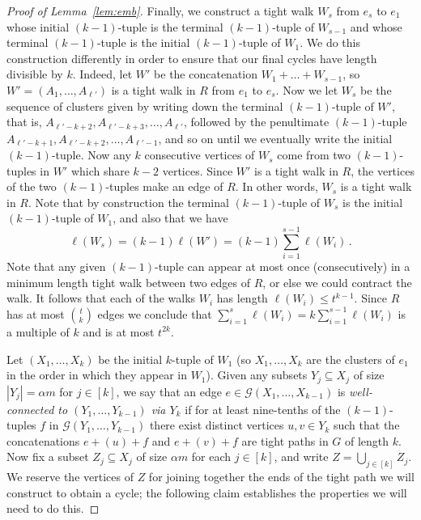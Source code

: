 \documentclass[12pt,a4paper]{amsart}
\newcommand{\cG}{\mathcal{G}}
\begin{document}
\begin{proof}[Proof of Lemma~\ref{lem:emb}]
 Finally, we construct a tight walk $W_s$ from $e_s$ to $e_1$ whose initial $(k-1)$-tuple is the terminal $(k-1)$-tuple of $W_{s-1}$ and whose terminal $(k-1)$-tuple is the initial $(k-1)$-tuple of $W_1$. We do this construction differently in order to ensure that our final cycles have length divisible by $k$. Indeed, let $W'$ be the concatenation $W_1 + \dots + W_{s-1}$, so $W'=(A_1,\ldots,A_{\ell'})$ is a
 tight walk in $R$ from $e_1$ to $e_s$. Now we let $W_s$ be the sequence of clusters
 given by writing down the terminal $(k-1)$-tuple of $W'$, that is, $A_{\ell'-k+2},A_{\ell'-k+3},\dots,A_{\ell'}$, followed by the
 penultimate $(k-1)$-tuple $A_{\ell'-k+1},A_{\ell'-k+2},\dots,A_{\ell'-1}$, and so on until we eventually write the initial
 $(k-1)$-tuple. Now any $k$ consecutive vertices of $W_s$ come from two $(k-1)$-tuples in $W'$ which share $k-2$ vertices. Since $W'$ is a tight walk in $R$, the vertices of the two $(k-1)$-tuples make an edge of $R$. In other words, $W_s$ is a tight walk in $R$. Note that by construction the terminal $(k-1)$-tuple of $W_s$ is the initial $(k-1)$-tuple of $W_1$, and also that we have
 \[\ell(W_s) = (k-1) \ell(W') = (k-1) \sum_{i = 1}^{s-1} \ell(W_i)\,.\]
 Note that
 any given $(k-1)$-tuple can appear at most once (consecutively) in a minimum length tight walk between two edges of $R$, or else we
 could contract the walk. It follows that
 each of the walks $W_i$ has length $\ell(W_i) \leq t^{k-1}$. Since
 $R$ has at most $\binom{t}{k}$ edges we conclude that $\sum_{i=1}^s
 \ell(W_i) = k \sum_{i = 1}^{s-1} \ell(W_i)$ is a multiple of $k$ and is at most $t^{2k}$.

Let $(X_1, \dots, X_k)$ be the initial $k$-tuple of $W_1$ (so $X_1, \dots, X_k$ are the clusters of $e_1$ in the order in which they appear in $W_1$). Given any subsets $Y_j \subseteq X_j$ of size $|Y_j| = \alpha m$ for $j \in [k]$, we say that an edge $e \in \cG(X_1, \dots, X_{k-1})$ is \emph{well-connected to $(Y_1, \dots, Y_{k-1})$ via $Y_k$} if for at least nine-tenths of the $(k-1)$-tuples $f$ in $\cG(Y_1,\ldots, Y_{k-1})$ there exist distinct vertices $u, v \in Y_k$ such that the concatenations $e + (u) + f$ and $e + (v) + f$ are tight paths in $G$ of length $k$. 
Now fix a subset $Z_j \subseteq X_j$ of size $\alpha m$ for each $j \in [k]$, and write
$Z = \bigcup_{j \in [k]} Z_j$. We reserve the vertices of $Z$ for joining
together the ends of the tight path we will construct to obtain a cycle; the following claim establishes the properties we will need to do this.


\end{proof}
\end{document}
